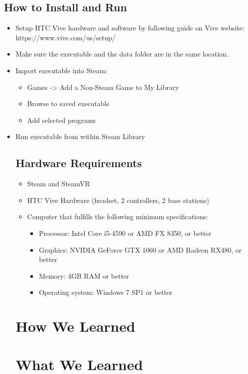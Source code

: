 \documentclass[10pt,journal,compsoc,onecolumn, draftclsnofoot]{IEEEtran}
\begin{document}
\subsection{How to Install and Run}
\begin{itemize}
  \item Setup HTC Vive hardware and software by following guide on Vive website: https://www.vive.com/us/setup/
  \item Make sure the executable and the data folder are in the same location.
  \item Import executable into Steam:
  \begin{itemize}
    \item Games -> Add a Non-Steam Game to My Library
    \item Browse to saved executable
    \item Add selected programs
  \end{itemize}
  \item Run executable from within Steam Library

\subsection{Hardware Requirements}
\begin{itemize}
  \item Steam and SteamVR
  \item HTC Vive Hardware (headset, 2 controllers, 2 base stations)
  \item Computer that fulfills the following minimum specifications:
  \begin{itemize}
    \item Processor: Intel Core i5-4590 or AMD FX 8350, or better
    \item Graphics: NVIDIA GeForce GTX 1060 or AMD Radeon RX480, or better
    \item Memory: 4GB RAM or better
    \item Operating system: Windows 7 SP1 or better
  \end{itemize}
\end{itemize}


\section{How We Learned}

\section{What We Learned}

\end{itemize}
\end{document}
